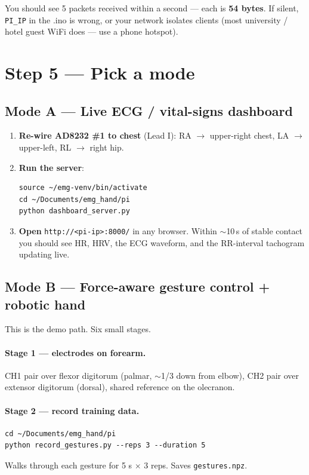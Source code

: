 \documentclass[10pt, a4paper]{article}
\begin{document}
You should see 5 packets received within a second --- each is \textbf{54 bytes}. If silent, \texttt{PI\_IP} in the .ino is wrong, or your network isolates clients (most university / hotel guest WiFi does --- use a phone hotspot).

\section*{Step 5 --- Pick a mode}

\subsection*{Mode A --- Live ECG / vital-signs dashboard}

\begin{enumerate}
  \item \textbf{Re-wire AD8232 \#1 to chest} (Lead I): RA $\rightarrow$ upper-right chest, LA $\rightarrow$ upper-left, RL $\rightarrow$ right hip.
  \item \textbf{Run the server}:
\begin{lstlisting}
source ~/emg-venv/bin/activate
cd ~/Documents/emg_hand/pi
python dashboard_server.py
\end{lstlisting}
  \item \textbf{Open} \texttt{http://<pi-ip>:8000/} in any browser. Within $\sim$10\,s of stable contact you should see HR, HRV, the ECG waveform, and the RR-interval tachogram updating live.
\end{enumerate}

\subsection*{Mode B --- Force-aware gesture control + robotic hand}

This is the demo path. Six small stages.

\paragraph{Stage 1 --- electrodes on forearm.}
CH1 pair over flexor digitorum (palmar, $\sim$1/3 down from elbow), CH2 pair over extensor digitorum (dorsal), shared reference on the olecranon.

\paragraph{Stage 2 --- record training data.}
\begin{lstlisting}
cd ~/Documents/emg_hand/pi
python record_gestures.py --reps 3 --duration 5
\end{lstlisting}
Walks through each gesture for 5 s $\times$ 3 reps. Saves \texttt{gestures.npz}.
\end{document}
